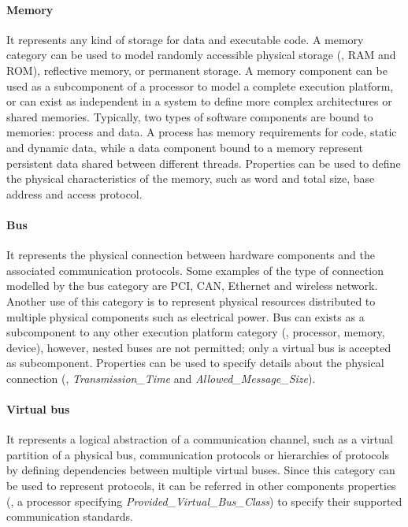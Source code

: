 \paragraph{Memory}  It represents any kind of storage for data and executable code. A memory category can be used to model randomly accessible physical storage (\eg, RAM and ROM), reflective memory, or permanent storage. A memory component can be used as a subcomponent of a processor to model a complete execution platform, or can exist as independent in a system to define more complex architectures or shared memories. Typically, two types of software components are bound to memories: process and data. A process has memory requirements for code, static and dynamic data, while a data component bound to a memory represent persistent data shared between different threads. Properties can be used to define the physical characteristics of the memory, such as word and total size, base address and access protocol.

\paragraph{Bus} It represents the physical connection between hardware components and the associated communication protocols. Some examples of the type of connection modelled by the bus category are PCI, CAN, Ethernet and wireless network. Another use of this category is to represent physical resources distributed to multiple physical components such as electrical power. Bus can exists as a subcomponent to any other execution platform category (\ie, processor, memory, device), however, nested buses are not permitted; only a virtual bus is accepted as subcomponent. Properties can be used to specify details about the physical connection (\eg, \textit{Transmission\_Time} and \textit{Allowed\_Message\_Size}).

\paragraph{Virtual bus} It represents a logical abstraction of a communication channel, such as a virtual partition of a physical bus, communication protocols or hierarchies of protocols by defining dependencies between multiple virtual buses. Since this category can be used to represent protocols, it can be referred in other components properties (\eg, a processor specifying \textit{Provided\_Virtual\_Bus\_Class}) to specify their supported communication standards.

